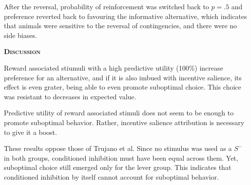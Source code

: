 \documentclass[a4paper,12pt]{article}
\begin{document}
After the reversal, probability of reinforcement was switched back to $p={.}5$ and preference reverted back to favouring the informative alternative, which indicates that animals were sensitive to the reversal of contingencies, and there were no side biases.

{\scshape\bfseries Discussion}

Reward associated stiumuli with a high predictive utility (100\%) increase preference for an alternative, and if it is also imbued with incentive salience, its effect is even grater, being able to even promote suboptimal choice. This choice was resistant to decreases in expected value.

Predictive utility of reward associated stimuli does not seem to be enough to promote suboptimal behavior. Rather, incentive salience attribution is necessary to give it a boost.

These results oppose those of Trujano et al. Since no stimulus was used as a $S^-$ in both groups, conditioned inhibition must have been equal across them. Yet, suboptimal choice still emerged only for the lever group. This indicates that conditioned inhibition by itself cannot account for suboptimal behavior.
\end{document}
